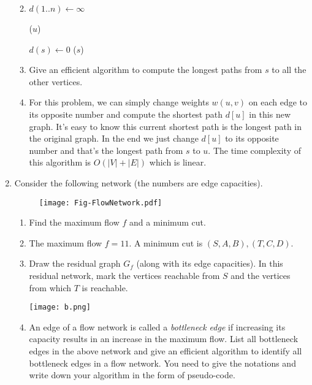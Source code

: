 \documentclass[12pt,a4paper]{article}
\makeatletter
\newtheorem*{solution}{Solution}
\theoremstyle{definition}
\renewenvironment{solution}[1][Solution] {\par\pushQED{\qed}\normalfont\topsep6\p@\@plus6\p@\relax\trivlist\item[\hskip\labelsep\bfseries#1\@addpunct{.}]\ignorespaces}{\popQED\endtrivlist\@endpefalse} \makeatother
\makeatother
\begin{document}
\begin{enumerate}
\begin{enumerate}
\begin{solution}
\begin{minipage}{0.9\textwidth}
\begin{algorithm}[H]
			$d(1..n)\leftarrow\infty$\;
			\BlankLine
			
			\dfs($u$)
			\BlankLine
			
			$d(s)\leftarrow 0$\;
			\dfs($s$)\;
		\end{algorithm}
	\end{minipage}
\end{solution}

\item
Give an efficient algorithm to compute the longest paths from $s$ to all the other vertices.
\begin{solution}
	For this problem, we can simply change weights $w(u,v)$ on each edge to its opposite number and compute the shortest path $d[u]$ in this new graph. It's easy to know this current shortest path is the longest path in the original graph. In the end we just change $d[u]$ to its opposite number and that's the longest path from $s$ to $u$. The time complexity of this algorithm is $O(|V|+|E|)$ which is linear.\par
\end{solution}
\end{enumerate}

\item
Consider the following network (the numbers are edge capacities).

\begin{figure}[htbp]
  \centering
  \texttt{[image: Fig-FlowNetwork.pdf]}
\end{figure}

\begin{enumerate}
\item
Find the maximum flow $f$ and a minimum cut.
\begin{solution}
	The maximum flow $f=11$. A minimum cut is $(S,A,B), (T,C,D)$.\par
\end{solution}
\item
Draw the residual graph $G_f$ (along with its edge capacities). In this residual network, mark the vertices reachable from $S$ and the vertices from which $T$ is reachable.
\begin{center}
	\texttt{[image: b.png]}
\end{center}

\item
An edge of a flow network is called a \emph{bottleneck edge} if increasing its capacity results in an increase in the maximum flow. List all bottleneck edges in the above network and give an efficient algorithm to identify all bottleneck edges in a flow network. You need to give the notations and write down your algorithm in the form of pseudo-code.


\end{enumerate}
\end{enumerate}
\end{document}
